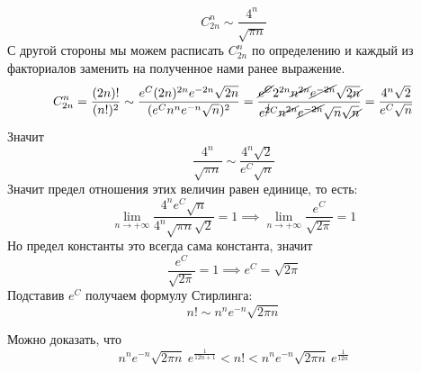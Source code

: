 \begin{enumerate}
    \begin{equation*}
        C_{2n}^{n} \sim \frac{4^n}{\sqrt{\pi n}}
    \end{equation*}
    С другой стороны мы можем расписать $C_{2n}^{n}$ по определению и каждый из факториалов заменить на полученное нами ранее выражение.
    \begin{equation*}
        C_{2n}^{n} = \frac{(2n)!}{(n!)^2} \sim \frac{e^C(2n)^{2n}e^{-2n}\sqrt{2n}}{(e^Cn^ne^{-n}\sqrt{n})^2} =
        \frac{\cancel{e^C}2^{2n}\cancel{n^{2n}}\cancel{e^{-2n}}\sqrt{2\cancel{n}}}{e^{\cancel{2}C}\cancel{n^{2n}}\cancel{e^{-2n}}\sqrt{n}\sqrt{\cancel{n}}} =
        \frac{4^n\sqrt{2}}{e^C\sqrt{n}}
    \end{equation*}
    Значит
    \begin{equation*}
        \frac{4^n}{\sqrt{\pi n}} \sim \frac{4^n \sqrt{2}}{e^C \sqrt{n}}
    \end{equation*}
    Значит предел отношения этих величин равен единице, то есть:
    \begin{equation*}
        \lim\limits_{n \to +\infty} \frac{4^n e^C\sqrt{n}}{4^n \sqrt{\pi n} \sqrt{2}} = 1
        \implies
        \lim\limits_{n \to +\infty} \frac{e^C}{\sqrt{2\pi}} = 1
    \end{equation*}
    Но предел константы это всегда сама константа, значит
    \begin{equation*}
        \frac{e^C}{\sqrt{2\pi}} = 1 \implies e^C = \sqrt{2\pi}
    \end{equation*}
    Подставив $e^C$ получаем формулу Стирлинга:
    \begin{equation*}
        \boxed{n! \sim n^ne^{-n}\sqrt{2\pi n}}
    \end{equation*}
    \begin{notice}
        Можно доказать, что
        \begin{equation*}
            n^ne^{-n}\sqrt{2\pi n} \: e^{\frac{1}{12n + 1}} < n! <
            n^ne^{-n}\sqrt{2\pi n} \: e^{\frac{1}{12n}}
        \end{equation*}
    \end{notice}
\end{enumerate}